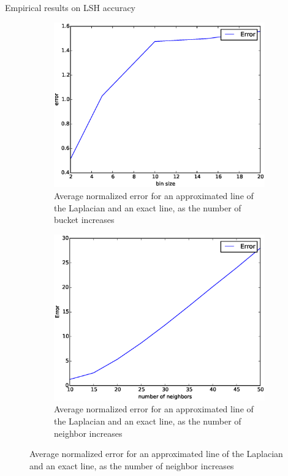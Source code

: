 \documentclass[11pt)]{beamer}
\begin{document}
\begin{frame}{Empirical results on LSH accuracy}
\begin{itemize}
\begin{figure}[!h]
\begin{subfigure}{0.27\textwidth}
   \includegraphics[width=\textwidth]{error_binsize.eps}
   \caption{Average normalized error for an approximated line of the Laplacian and an exact line, as the number of bucket increases}
 \end{subfigure}\hfill
 \centering
 \begin{subfigure}{0.27\textwidth}
   \includegraphics[width=\textwidth]{error_k.eps}
   \caption{Average normalized error for an approximated line of the Laplacian and an exact line, as the number of neighbor increases}
 \end{subfigure}

\end{figure}
\end{itemize}

\end{frame}
\end{document}

